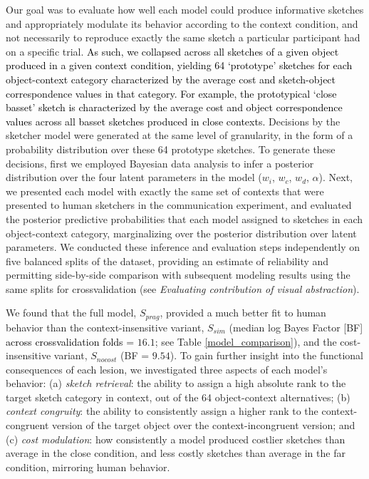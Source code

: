 \documentclass{svjour3}
\newcommand{\revised}[1]{\textcolor{Black}{#1}}
\begin{document}
Our goal was to evaluate how well each model could produce informative sketches and appropriately modulate its behavior according to the context condition, and not necessarily to reproduce exactly the same sketch a particular participant had on a specific trial.  
\revised{As such, we collapsed across all sketches of a given object produced in a given context condition, yielding 64 `prototype' sketches for each object-context category characterized by the average cost and sketch-object correspondence values in that category. For example, the prototypical `close basset' sketch is characterized by the average cost and object correspondence values across all basset sketches produced in close contexts.}
Decisions by the sketcher model were generated at the same level of granularity, in the form of a probability distribution over these 64 prototype sketches. 
To generate these decisions, first we employed Bayesian data analysis to infer a posterior distribution over the four latent parameters in the model ($w_{i}$, $w_{c}$, $w_{d}$, $\alpha$). 
Next, we presented each model with exactly the same set of contexts that were presented to human sketchers in the communication experiment, and evaluated the posterior predictive probabilities that each model assigned to sketches in each object-context category, marginalizing over the posterior distribution over latent parameters. 
We conducted these inference and evaluation steps independently on five balanced splits of the dataset, providing an estimate of reliability and permitting side-by-side comparison with subsequent modeling results using the same splits for crossvalidation (see \textit{Evaluating contribution of visual abstraction}). 

We found that the full model, $S_{prag}$, provided a much better fit to human behavior than the context-insensitive variant, $S_{sim}$ (median log Bayes Factor [BF] \revised{across crossvalidation folds} = $16.1$; see Table \ref{model_comparison}), and the cost-insensitive variant, $S_{nocost}$ (BF = $9.54$).
To gain further insight into the functional consequences of each lesion, we investigated three aspects of each model's behavior: (a) \textit{sketch retrieval}: the ability to assign a high absolute rank to the target sketch category in context, out of the 64 object-context alternatives; (b) \textit{context congruity}: the ability to consistently assign a higher rank to the context-congruent version of the target object over the context-incongruent version; and (c) \textit{cost modulation}: how consistently a model produced costlier sketches than average in the close condition, and less costly sketches than average in the far condition, mirroring human behavior.
\end{document}
